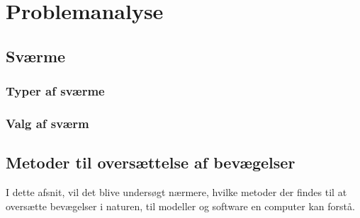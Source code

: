 \chapter{Problemanalyse}\label{ch:problemanalyse}

\section{Sværme}




\subsection{Typer af sværme}

\subsection{Valg af sværm}



\section{Metoder til oversættelse af bevægelser}
I dette afsnit, vil det blive undersøgt nærmere, hvilke metoder der findes til at oversætte bevægelser i naturen, til modeller og software en computer kan forstå. 

